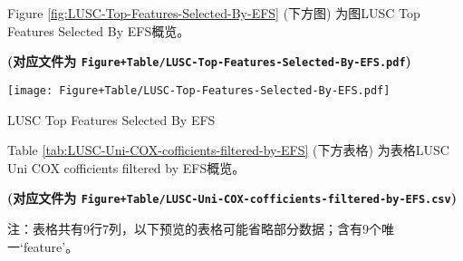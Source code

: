 \documentclass[
]{article}
\begin{document}
\begin{center}\vspace{1.5cm}\end{center}

Figure \ref{fig:LUSC-Top-Features-Selected-By-EFS} (下方图) 为图LUSC Top Features Selected By EFS概览。

\textbf{(对应文件为 \texttt{Figure+Table/LUSC-Top-Features-Selected-By-EFS.pdf})}

\def\@captype{figure}
\begin{center}
\texttt{[image: Figure+Table/LUSC-Top-Features-Selected-By-EFS.pdf]}
\caption{LUSC Top Features Selected By EFS}\label{fig:LUSC-Top-Features-Selected-By-EFS}
\end{center}

\begin{center}\vspace{1.5cm}\end{center}

\begin{center}\vspace{1.5cm}\end{center}

Table \ref{tab:LUSC-Uni-COX-cofficients-filtered-by-EFS} (下方表格) 为表格LUSC Uni COX cofficients filtered by EFS概览。

\textbf{(对应文件为 \texttt{Figure+Table/LUSC-Uni-COX-cofficients-filtered-by-EFS.csv})}

\begin{center}\begin{tcolorbox}[colback=gray!10, colframe=gray!50, width=0.9\linewidth, arc=1mm, boxrule=0.5pt]注：表格共有9行7列，以下预览的表格可能省略部分数据；含有9个唯一`feature'。
\end{tcolorbox}
\end{center}
\end{document}
